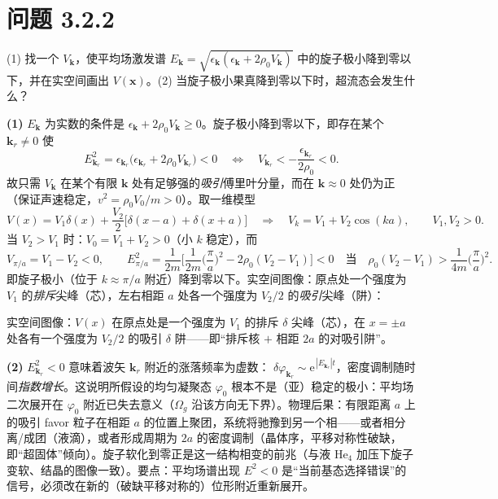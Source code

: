 \section*{问题 3.2.2}
\begin{problem}
(1) 找一个 $V_{\pmb{k}}$，使平均场激发谱 $E_{\pmb{k}}=\sqrt{\epsilon_{\pmb{k}}(\epsilon_{\pmb{k}}+2\rho_0V_{\pmb{k}})}$ 中的旋子极小降到零以下，并在实空间画出 $V(\pmb{x})$。(2) 当旋子极小果真降到零以下时，超流态会发生什么？
\end{problem}
\solution

\textbf{(1)} $E_{\pmb{k}}$ 为实数的条件是 $\epsilon_{\pmb{k}}+2\rho_0V_{\pmb{k}}\ge0$。旋子极小降到零以下，即存在某个 $\pmb{k}_r\neq0$ 使
\begin{equation*}
E_{\pmb{k}_r}^{2}=\epsilon_{\pmb{k}_r}\big(\epsilon_{\pmb{k}_r}+2\rho_0V_{\pmb{k}_r}\big)<0
\quad\Longleftrightarrow\quad
V_{\pmb{k}_r}<-\frac{\epsilon_{\pmb{k}_r}}{2\rho_0}<0 .
\end{equation*}
故只需 $V_{\pmb{k}}$ 在某个有限 $\pmb{k}$ 处有足够强的\emph{吸引}傅里叶分量，而在 $\pmb{k}\approx0$ 处仍为正（保证声速稳定，$v^{2}=\rho_0V_0/m>0$）。取一维模型
\begin{equation*}
V(x)=V_1\delta(x)+\frac{V_2}{2}\big[\delta(x-a)+\delta(x+a)\big]
\quad\Longrightarrow\quad
V_k=V_1+V_2\cos(ka),\qquad V_1,V_2>0 .
\end{equation*}
当 $V_2>V_1$ 时：$V_0=V_1+V_2>0$（小 $k$ 稳定），而
\begin{equation*}
V_{\pi/a}=V_1-V_2<0,\qquad
E_{\pi/a}^{2}=\frac{1}{2m}\Big[\frac{1}{2m}\Big(\frac{\pi}{a}\Big)^{2}-2\rho_0(V_2-V_1)\Big]<0
\quad\text{当}\quad
\rho_0(V_2-V_1)>\frac{1}{4m}\Big(\frac{\pi}{a}\Big)^{2} .
\end{equation*}
即旋子极小（位于 $k\approx\pi/a$ 附近）降到零以下。实空间图像：原点处一个强度为 $V_1$ 的\emph{排斥}尖峰（芯），左右相距 $a$ 处各一个强度为 $V_2/2$ 的\emph{吸引}尖峰（阱）：

实空间图像：$V(x)$ 在原点处是一个强度为 $V_1$ 的排斥 $\delta$ 尖峰（芯），在 $x=\pm a$ 处各有一个强度为 $V_2/2$ 的吸引 $\delta$ 阱——即“排斥核 $+$ 相距 $2a$ 的对吸引阱”。

\textbf{(2)} $E_{\pmb{k}_r}^{2}<0$ 意味着波矢 $\pmb{k}_r$ 附近的涨落频率为虚数：
$\delta\varphi_{\pmb{k}_r}\sim\mathrm{e}^{\,|E_{\pmb{k}_r}|t}$，密度调制随时间\emph{指数增长}。这说明所假设的均匀凝聚态 $\varphi_0$ 根本不是（亚）稳定的极小：平均场二次展开在 $\varphi_0$ 附近已失去意义（$\Omega_g$ 沿该方向无下界）。物理后果：有限距离 $a$ 上的吸引 favor 粒子在相距 $a$ 的位置上聚团，系统将驰豫到另一个相——或者相分离/成团（液滴），或者形成周期为 $2a$ 的密度调制（晶体序，平移对称性破缺，即“超固体”倾向）。旋子软化到零正是这一结构相变的前兆（与液 He$_4$ 加压下旋子变软、结晶的图像一致）。要点：平均场谱出现 $E^2<0$ 是“当前基态选择错误”的信号，必须改在新的（破缺平移对称的）位形附近重新展开。


